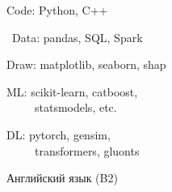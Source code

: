 \documentclass[11pt]{spidercv}
\begin{document}
    \begin{SideBar}{\ColorBackground}{\ColorTextSide}
        
        \begin{ItemList}{\ColorHighlight}
            \item [\faCode]Code: Python, C++
            \item [\faDatabase]\ Data: pandas, SQL, Spark
            \item [\faBarChartO]Draw: matplotlib, seaborn, shap
            \item [\faSpinner]ML: scikit-learn, catboost,\\ \ \ \ \ \ statsmodels, etc.
            \item [\faConnectdevelop]DL: pytorch, gensim,\\ \ \ \ \ \ transformers, gluonts
            \item [\faLanguage]Английский язык (B2)
        \end{ItemList}

        \vspace*{0.4cm}
        
        
        \\
        \\
        \\
        \\


        \vspace*{0.7cm}


        \begin{SpiderDiagram}{\ColorTextSide}{\ColorHighlight}
            
        \end{SpiderDiagram}

        \vspace*{0.9cm}

            
        
    \end{SideBar}
\end{document}
